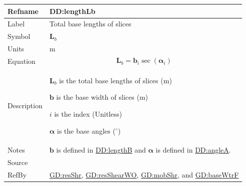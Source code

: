 \documentclass[12pt]{article}
\begin{document}
\medskip
\noindent
\begin{minipage}{\textwidth}
\begin{tabular}{>{\raggedright}p{}>{\raggedright\arraybackslash}p{}}
\toprule \textbf{Refname} & \textbf{DD:lengthLb}
\label{DD:lengthLb}
\\ \midrule
Label & Total base lengths of slices
        
\\ \midrule
Symbol & ${\symbf{L}_{b}}$
         
\\ \midrule
Units & ${\text{m}}$
        
\\ \midrule
Equation & \begin{displaymath}
           {\symbf{L}_{b}}={\symbf{b}}_{i} \sec\left({\symbf{α}}_{i}\right)
           \end{displaymath}
\\ \midrule
Description & \begin{symbDescription}
              \item{${\symbf{L}_{b}}$ is the total base lengths of slices (${\text{m}}$)}
              \item{$\symbf{b}$ is the base width of slices (${\text{m}}$)}
              \item{$i$ is the index (Unitless)}
              \item{$\symbf{α}$ is the base angles (${{}^{\circ}}$)}
              \end{symbDescription}
\\ \midrule
Notes & $\symbf{b}$ is defined in \hyperref[DD:lengthB]{DD:lengthB} and $\symbf{α}$ is defined in \hyperref[DD:angleA]{DD:angleA}.
        
\\ \midrule
Source & \cite{fredlund1977}
         
\\ \midrule
RefBy & \hyperref[GD:resShr]{GD:resShr}, \hyperref[GD:resShearWO]{GD:resShearWO}, \hyperref[GD:mobShr]{GD:mobShr}, and \hyperref[GD:baseWtrF]{GD:baseWtrF}
        
\\ \bottomrule
\end{tabular}
\end{minipage}
\end{document}
